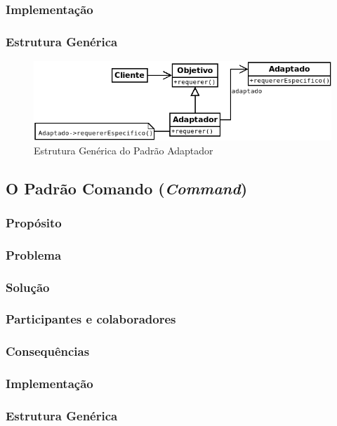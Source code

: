\subsubsection{Implementação}
\subsubsection{Estrutura Genérica}

\begin{figure}[h]
\begin{center}
\includegraphics[scale=0.6]{adaptador.png}
\caption{Estrutura Genérica do Padrão Adaptador}\label{fig:adaptador}
\end{center}
\end{figure}

\subsection{O Padrão Comando (\textit{Command})}
\subsubsection{Propósito}
\subsubsection{Problema}
\subsubsection{Solução}
\subsubsection{Participantes e colaboradores}
\subsubsection{Consequências}
\subsubsection{Implementação}
\subsubsection{Estrutura Genérica}

